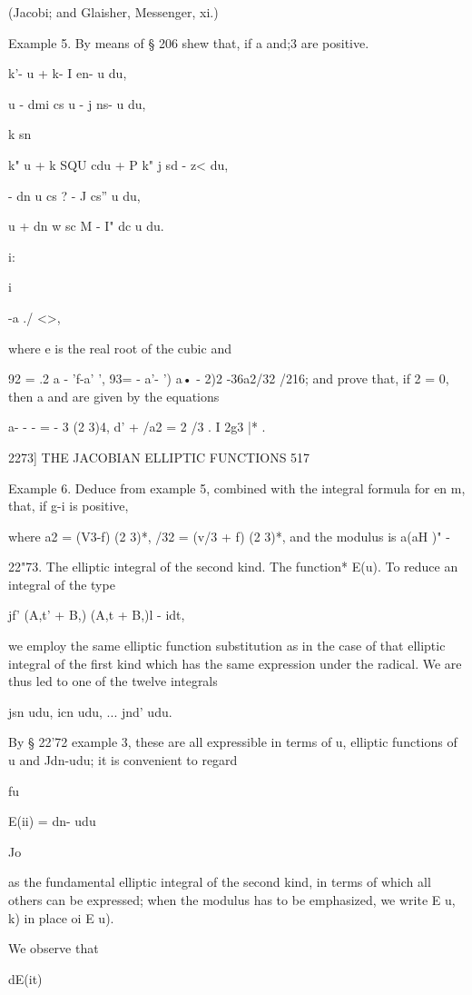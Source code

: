 (Jacobi; and Glaisher, Messenger, xi.)

Example 5. By means of § 206 shew that, if a and;3 are positive.

k'- u + k- I en- u du,

u - dmi cs u - j ns- u du,

k sn %

k" u + k SQU cdu + P k" j sd - z< du,

- dn u cs ? - J cs'' u du,

u + dn w sc M - I" dc u du.

i:

 i

-a ./ <>,

where e is the real root of the cubic and

92 = .2 a - 'f-a' ', 93= - a'- ') a• - 2)2 -36a2/32 /216; and prove
that, if 2 = 0, then a and are given by the equations

a- - - = - 3 (2 3)4, d' + /a2 = 2 /3 . I 2g3 |* .

2273] THE JACOBIAN ELLIPTIC FUNCTIONS 517

Example 6. Deduce from example 5, combined with the integral formula
for en m, that, if g-i is positive,

where a2 = (V3-f) (2 3)*, /32 = (v/3 + f) (2 3)*, and the modulus is
a(aH )" -

22"73. The elliptic integral of the second kind. The function* E(u).
To reduce an integral of the type

jf' (A,t' + B,) (A,t + B,)l - idt,

we employ the same elliptic function substitution as in the case of
that elliptic integral of the first kind which has the same expression
under the radical. We are thus led to one of the twelve integrals

jsn udu, icn udu, ... jnd' udu.

By § 22'72 example 3, these are all expressible in terms of u,
elliptic functions of u and Jdn-udu; it is convenient to regard

fu

E(ii) = dn- udu

Jo

as the fundamental elliptic integral of the second kind, in terms of
which all others can be expressed; when the modulus has to be
emphasized, we write E u, k) in place oi E u).

We observe that

dE(it)

